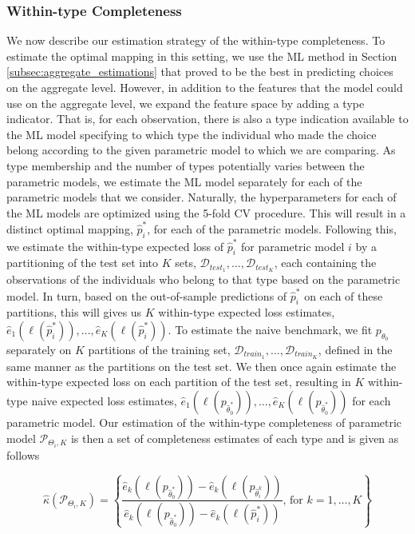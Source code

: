 \documentclass[11pt,a4paper]{article}
\theoremstyle{definition}
\begin{document}
\subsubsection{Within-type Completeness}
\label{subsubsec:within-type_completeness}
We now describe our estimation strategy of the within-type completeness. To estimate the optimal mapping in this setting, we use the ML method in Section \ref{subsec:aggregate_estimations} that proved to be the best in predicting choices on the aggregate level. However, in addition to the features that the model could use on the aggregate level, we expand the feature space by adding a type indicator. That is, for each observation, there is also a type indication available to the ML model specifying to which type the individual who made the choice belong according to the given parametric model to which we are comparing. As type membership and the number of types potentially varies between the parametric models, we estimate the ML model separately for each of the parametric models that we consider. Naturally, the hyperparameters for each of the ML models are optimized using the 5-fold CV procedure. This will result in a distinct optimal mapping, $\hat{p}^*_{i}$, for each of the parametric models. Following this, we estimate the within-type expected loss of $\hat{p}^*_{i}$ for parametric model $i$ by a partitioning of the test set into $K$ sets, $\mathcal{D}_{test_1},\dots,\mathcal{D}_{test_K}$, each containing the observations of the individuals who belong to that type based on the parametric model. In turn, based on the out-of-sample predictions of $\hat{p}^*_{i}$ on each of these partitions, this will gives us $K$ within-type expected loss estimates,  $\hat{e}_1(\ell(\hat{p}^{*}_{i})),\dots,\hat{e}_K(\ell(\hat{p}^{*}_{i}))$. To estimate the naive benchmark, we fit $p_{\theta_{0}}$ separately on $K$ partitions of the training set, $\mathcal{D}_{train_1},\dots,\mathcal{D}_{train_K}$,  defined in the same manner as the partitions on the test set. We then once again estimate the within-type expected loss on each partition of the test set, resulting in $K$ within-type naive expected loss estimates, $\hat{e}_1(\ell(p_{\hat{\theta}^{*}_{0}})),\dots,\hat{e}_K(\ell(p_{\hat{\theta}^{*}_{0}}))$ for each parametric model. Our estimation of the within-type completeness of parametric model $\mathcal{P}_{\Theta_i,K}$ is then a set of completeness estimates of each type and is given as follows

\begin{equation}
\label{eq:type-completeness_estim}
\hat{\kappa}(\mathcal{P}_{\Theta_i,K})=\left\{\frac{\hat{e}_k(\ell(p_{\hat{\theta}^*_{0}}))-\hat{e}_k(\ell(p_{\hat{\theta}^{k}_{i}}))}{\hat{e}_k(\ell(p_{\hat{\theta}^*_{0}}))-\hat{e}_k(\ell(\hat{p}^{*}_{i}))}\text{, for } k=1,\dots, K\right\}
\end{equation}
\end{document}
